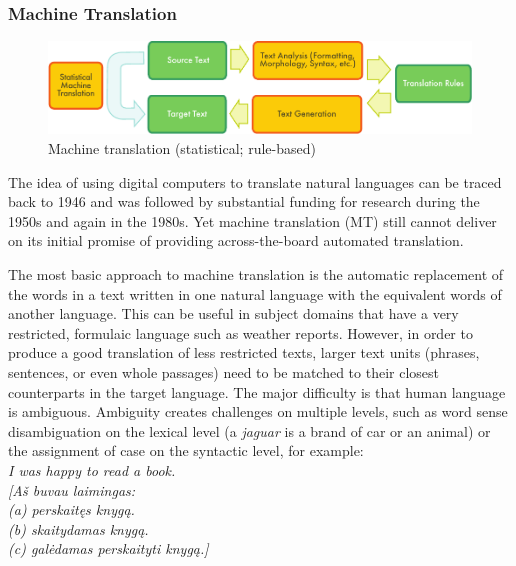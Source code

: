 \documentclass[]{../metanetpaper}
\begin{document}
\begin{multicols}{2}
\subsubsection{Machine Translation}

\begin{figure}[htb]
  \center
  \includegraphics[width=\textwidth]{../_media/english/machine_translation}
  \caption{Machine translation (statistical; rule-based)}
  \label{fig:mtarch_en}
\end{figure}

The idea of using digital computers to translate natural languages can be traced back to 1946 and was followed by substantial funding for research during the 1950s and again in the 1980s. 
Yet machine translation (MT) still cannot deliver on its initial promise of providing across-the-board automated translation.  


The most basic approach to machine translation is the automatic replacement of the words in a text written in one natural language with the equivalent words of another language. This can be useful in subject domains that have a very restricted, formulaic language such as weather reports.
However, in order to produce a good translation of less restricted texts, larger text units (phrases, sentences, or even whole passages) need to be matched to their closest counterparts in the target language. The major difficulty is that human language is ambiguous. Ambiguity creates challenges on multiple levels, such as word sense disambiguation on the lexical level (a \textit{jaguar} is a brand of car or an animal) or the assignment of case on the syntactic level, for example:\\
 \textit{I was happy to read a book.\\
      {[}Aš buvau laimingas:\\
      (a) perskaitęs knygą.\\
      (b) skaitydamas knygą.\\
      (c) galėdamas perskaityti knygą.] }


\end{multicols}
\end{document}
